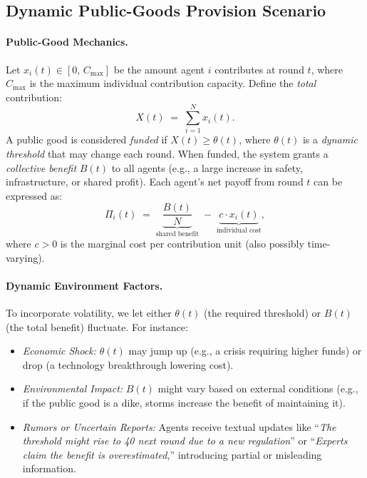 \subsection{Dynamic Public-Goods Provision Scenario}

\paragraph{Public-Good Mechanics.}
Let $x_i(t) \in [0,\,C_{\max}]$ be the amount agent $i$ contributes at round $t$, where $C_{\max}$ is the maximum individual contribution capacity. Define the \emph{total} contribution:
\[
X(t) \;=\; \sum_{i=1}^N x_i(t).
\]
A public good is considered \emph{funded} if $X(t) \geq \theta(t)$, where $\theta(t)$ is a \emph{dynamic threshold} that may change each round. When funded, the system grants a \emph{collective benefit} $B(t)$ to all agents (e.g., a large increase in safety, infrastructure, or shared profit). Each agent’s net payoff from round $t$ can be expressed as:
\[
\Pi_i(t) \;=\; \underbrace{\frac{B(t)}{N}}_{\text{shared benefit}} \;-\; \underbrace{c \cdot x_i(t)}_{\text{individual cost}},
\]
where $c>0$ is the marginal cost per contribution unit (also possibly time-varying).

\paragraph{Dynamic Environment Factors.}
To incorporate volatility, we let either $\theta(t)$ (the required threshold) or $B(t)$ (the total benefit) fluctuate. For instance:
\begin{itemize}
    \item \emph{Economic Shock:} $\theta(t)$ may jump up (e.g., a crisis requiring higher funds) or drop (a technology breakthrough lowering cost).
    \item \emph{Environmental Impact:} $B(t)$ might vary based on external conditions (e.g., if the public good is a dike, storms increase the benefit of maintaining it).
    \item \emph{Rumors or Uncertain Reports:} Agents receive textual updates like “\emph{The threshold might rise to 40 next round due to a new regulation}” or “\emph{Experts claim the benefit is overestimated},” introducing partial or misleading information.
\end{itemize}

